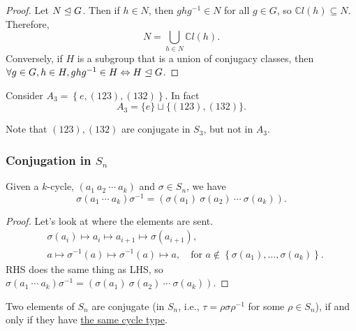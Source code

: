 \documentclass[a4paper]{article}
\begin{document}
\begin{proof}
  Let $ N \trianglelefteq G $. Then if $ h\in N $, then $ghg^{-1}\in N$ for
  all $g\in G$, so $ \mathbb{C}l(h) \subseteq N $. Therefore,
  \[
    N=\bigcup_{h\in N} \mathbb{C}l(h)
  .\]
  Conversely, if $H$ is a subgroup that is a union of conjugacy
  classes, then $ \forall g\in G, h\in H, ghg^{-1}\in H
  \Leftrightarrow H \trianglelefteq G $.
\end{proof}
\begin{example}
  Consider $ A_3=\left\{ e,(123),(132) \right\} $. In fact
  \[
    A_3 = \{e\}\sqcup \{(123),(132)\}
  .\]
\end{example}
\begin{remark}
  Note that $ (123),(132) $ are conjugate in $S_3$, but not in $A_3$.
\end{remark}
\subsubsection{Conjugation in $S_n$}
\begin{lemma}\label{lma:5.24}
  Given a $k$-cycle, $(a_1\ a_2\ \cdots\ a_k)$ and $ \sigma\in S_n $, we have
  \[
    \sigma(a_1\ \cdots
    \ a_k)\sigma^{-1}=(\sigma(a_1)\ \sigma(a_2)\ \cdots\ \sigma(a_k))
  .\]
\end{lemma}
\begin{proof}
  Let's look at where the elements are sent.
  \[
    \begin{aligned}
      &\sigma(a_i) \mapsto a_i \mapsto a_{i+1} \mapsto \sigma(a_{i+1}),\\
      &a \mapsto \sigma^{-1}(a) \mapsto \sigma^{-1}(a) \mapsto
      a,\quad \text{for $a\notin \left\{ \sigma(a_1),\dots,
      \sigma(a_k) \right\}$.}
    \end{aligned}
  \]
  RHS does the same thing as LHS, so $ \sigma(a_1\ \cdots
  \ a_k)\sigma^{-1}=(\sigma(a_1)\ \sigma(a_2)\ \cdots\ \sigma(a_k)) $.
\end{proof}
\begin{proposition}\label{prop:5.25}
  Two elements of $S_n$ are conjugate (in $S_n$, i.e.,
  $\tau=\rho\sigma\rho^{-1}$ for some $\rho \in S_n$), if and only if
  they have \underline{the same cycle type}.
\end{proposition}
\end{document}
